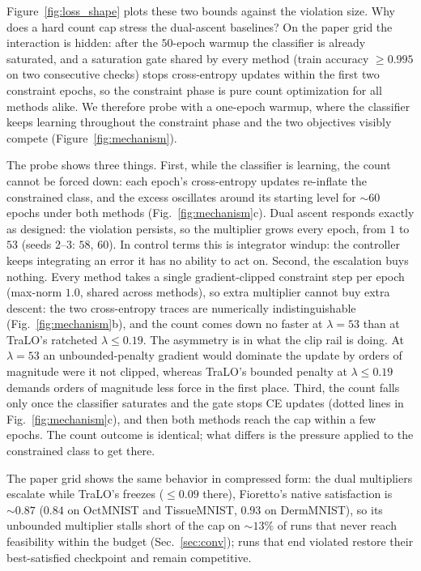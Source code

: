\documentclass[10pt]{article}
\begin{document}
\medskip
Figure~\ref{fig:loss_shape} plots these two bounds against the violation
size. Why does a hard count cap stress the dual-ascent baselines? On the
paper grid the interaction is hidden: after the $50$-epoch warmup the
classifier is already saturated, and a saturation gate shared by every
method (train accuracy $\ge 0.995$ on two consecutive checks) stops
cross-entropy updates within the first two constraint epochs, so the
constraint phase is pure count optimization for all methods alike. We
therefore probe with a one-epoch warmup, where the classifier keeps
learning throughout the constraint phase and the two objectives visibly
compete (Figure~\ref{fig:mechanism}).

The probe shows three things. First, while the classifier is learning,
the count cannot be forced down: each epoch's cross-entropy updates
re-inflate the constrained class, and the excess oscillates around its
starting level for ${\sim}60$ epochs under both methods
(Fig.~\ref{fig:mechanism}c). Dual ascent responds exactly as designed:
the violation persists, so the multiplier grows every epoch, from $1$ to
$53$ (seeds $2$--$3$: $58$, $60$). In control terms this is integrator
windup: the controller keeps integrating an error it has no ability to
act on. Second, the escalation buys nothing. Every method takes a
single gradient-clipped constraint step per epoch (max-norm $1.0$,
shared across methods), so extra multiplier cannot buy extra descent:
the two cross-entropy traces are numerically indistinguishable
(Fig.~\ref{fig:mechanism}b), and the count comes down no faster at
$\lambda{=}53$ than at TraLO's ratcheted $\lambda\le 0.19$. The
asymmetry is in what the clip rail is doing. At $\lambda{=}53$ an
unbounded-penalty gradient would dominate the update by orders of
magnitude were it not clipped, whereas TraLO's bounded penalty at
$\lambda\le 0.19$ demands orders of magnitude less force in the first
place. Third, the count falls only once the classifier saturates and the
gate stops CE updates (dotted lines in Fig.~\ref{fig:mechanism}c), and
then both methods reach the cap within a few epochs. The count outcome is
identical; what differs is the pressure applied to the constrained class
to get there.

The paper grid shows the same behavior in compressed form: the dual
multipliers escalate while TraLO's freezes ($\le 0.09$ there),
Fioretto's native satisfaction is ${\sim}0.87$ ($0.84$ on OctMNIST and
TissueMNIST, $0.93$ on DermMNIST), so its unbounded multiplier stalls
short of the cap on ${\sim}13\%$ of runs that never reach feasibility
within the budget (Sec.~\ref{sec:conv}); runs that end violated restore
their best-satisfied checkpoint and remain competitive.
\end{document}
